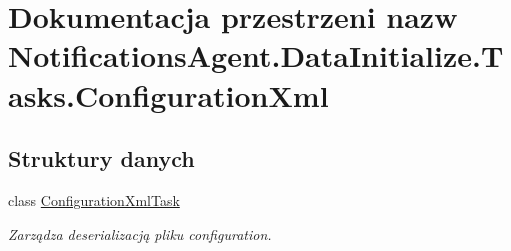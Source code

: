 \hypertarget{a00300}{}\section{Dokumentacja przestrzeni nazw Notifications\+Agent.\+Data\+Initialize.\+Tasks.\+Configuration\+Xml}
\label{a00300}
\subsection*{Struktury danych}
\begin{DoxyCompactItemize}
\item 
class \hyperlink{a00013}{Configuration\+Xml\+Task}
\begin{DoxyCompactList}\small\item\em Zarządza deserializacją pliku configuration. \end{DoxyCompactList}\end{DoxyCompactItemize}
